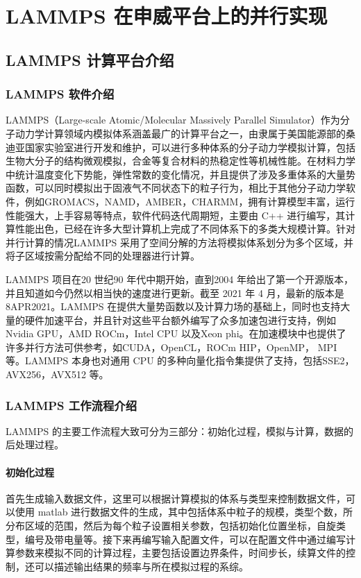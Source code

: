 
\chapter{LAMMPS 在申威平台上的并行实现}


\section{LAMMPS 计算平台介绍}
\subsection{LAMMPS 软件介绍}
LAMMPS（Large-scale Atomic/Molecular Massively Parallel Simulator）作为分子动力学计算领域内模拟体系涵盖最广的计算平台之一，由隶属于美国能源部的桑迪亚国家实验室进行开发和维护，可以进行多种体系的分子动力学模拟计算，包括生物大分子的结构微观模拟，合金等复合材料的热稳定性等机械性能。在材料力学中统计温度变化下势能，弹性常数的变化情况，并且提供了涉及多重体系的大量势函数，可以同时模拟出于固液气不同状态下的粒子行为，相比于其他分子动力学软件，例如GROMACS\cite{berendsen1995gromacs}，NAMD\cite{phillips2005scalable}，AMBER\cite{pearlman1995amber}，CHARMM\cite{brooks1983charmm}，拥有计算模型丰富，运行性能强大，上手容易等特点，软件代码迭代周期短，主要由 C++ 进行编写，其计算性能出色，已经在许多大型计算机上完成了不同体系下的多类大规模计算。针对并行计算的情况LAMMPS 采用了空间分解的方法将模拟体系划分为多个区域，并将子区域按需分配给不同的处理器进行计算。

LAMMPS 项目在20 世纪90 年代中期开始，直到2004 年给出了第一个开源版本，并且知道如今仍然以相当快的速度进行更新。截至 2021 年 4 月，最新的版本是8APR2021。LAMMPS 在提供大量势函数以及计算力场的基础上，同时也支持大量的硬件加速平台，并且针对这些平台额外编写了众多加速包进行支持，例如Nvidia GPU\cite{hong2009analytical}，AMD ROCm\cite{kuznetsov2019porting}，Intel CPU 以及Xeon phi\cite{chrysos2014intel}。在加速模块中也提供了许多并行方法可供参考，如CUDA，OpenCL，ROCm HIP，OpenMP， MPI 等。LAMMPS 本身也对通用 CPU 的多种向量化指令集提供了支持，包括SSE2\cite{bik2002automatic}，AVX256\cite{lim2018implementation}，AVX512\cite{cornea2015intel} 等。

\subsection{LAMMPS 工作流程介绍}
LAMMPS 的主要工作流程大致可分为三部分：初始化过程，模拟与计算，数据的后处理过程。

\subsubsection{初始化过程}
首先生成输入数据文件，这里可以根据计算模拟的体系与类型来控制数据文件，可以使用 matlab 进行数据文件的生成，其中包括体系中粒子的规模，类型个数，所分布区域的范围，然后为每个粒子设置相关参数，包括初始化位置坐标，自旋类型，编号及带电量等。接下来再编写输入配置文件，可以在配置文件中通过编写计算参数来模拟不同的计算过程，主要包括设置边界条件，时间步长，续算文件的控制，还可以描述输出结果的频率与所在模拟过程的系综。

